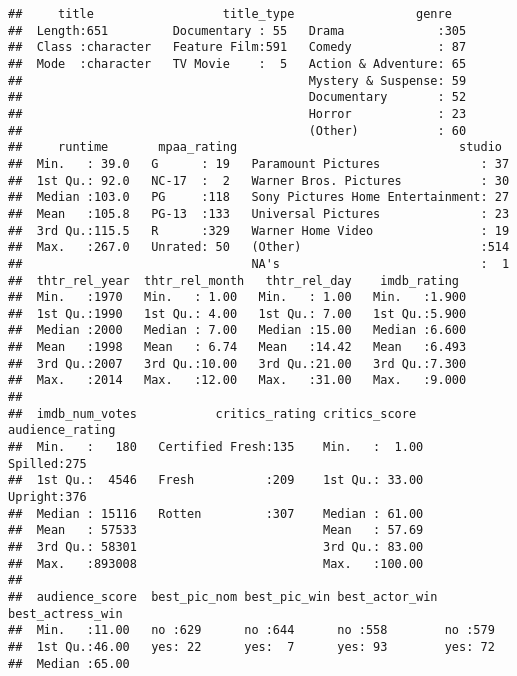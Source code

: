 \documentclass[]{article}
\begin{document}
\begin{verbatim}
##     title                  title_type                 genre    
##  Length:651         Documentary : 55   Drama             :305  
##  Class :character   Feature Film:591   Comedy            : 87  
##  Mode  :character   TV Movie    :  5   Action & Adventure: 65  
##                                        Mystery & Suspense: 59  
##                                        Documentary       : 52  
##                                        Horror            : 23  
##                                        (Other)           : 60  
##     runtime       mpaa_rating                               studio   
##  Min.   : 39.0   G      : 19   Paramount Pictures              : 37  
##  1st Qu.: 92.0   NC-17  :  2   Warner Bros. Pictures           : 30  
##  Median :103.0   PG     :118   Sony Pictures Home Entertainment: 27  
##  Mean   :105.8   PG-13  :133   Universal Pictures              : 23  
##  3rd Qu.:115.5   R      :329   Warner Home Video               : 19  
##  Max.   :267.0   Unrated: 50   (Other)                         :514  
##                                NA's                            :  1  
##  thtr_rel_year  thtr_rel_month   thtr_rel_day    imdb_rating   
##  Min.   :1970   Min.   : 1.00   Min.   : 1.00   Min.   :1.900  
##  1st Qu.:1990   1st Qu.: 4.00   1st Qu.: 7.00   1st Qu.:5.900  
##  Median :2000   Median : 7.00   Median :15.00   Median :6.600  
##  Mean   :1998   Mean   : 6.74   Mean   :14.42   Mean   :6.493  
##  3rd Qu.:2007   3rd Qu.:10.00   3rd Qu.:21.00   3rd Qu.:7.300  
##  Max.   :2014   Max.   :12.00   Max.   :31.00   Max.   :9.000  
##                                                                
##  imdb_num_votes           critics_rating critics_score    audience_rating
##  Min.   :   180   Certified Fresh:135    Min.   :  1.00   Spilled:275    
##  1st Qu.:  4546   Fresh          :209    1st Qu.: 33.00   Upright:376    
##  Median : 15116   Rotten         :307    Median : 61.00                  
##  Mean   : 57533                          Mean   : 57.69                  
##  3rd Qu.: 58301                          3rd Qu.: 83.00                  
##  Max.   :893008                          Max.   :100.00                  
##                                                                          
##  audience_score  best_pic_nom best_pic_win best_actor_win best_actress_win
##  Min.   :11.00   no :629      no :644      no :558        no :579         
##  1st Qu.:46.00   yes: 22      yes:  7      yes: 93        yes: 72         
##  Median :65.00                                                            

\end{verbatim}
\end{document}
